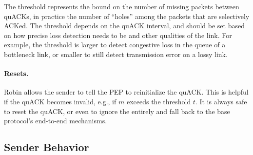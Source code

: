 The threshold represents the bound on the number of missing packets
between quACKs, in practice the number of ``holes'' among the packets that are
selectively ACKed. The threshold depends on the quACK interval, and
should be set based on how precise loss detection needs to be and
other qualities of the link.
For example, the threshold is larger to detect congestive loss in the queue of a
bottleneck link, or smaller to still detect transmission error on a lossy link.




\paragraph{Resets.}
Robin allows the sender to tell the PEP to reinitialize the quACK.
This is helpful if the quACK becomes
invalid, e.g., if $m$ exceeds the threshold $t$. It is
always safe to reset the quACK, or even to ignore the \sys entirely and
fall back to the base protocol's end-to-end mechanisms.

\subsection{Sender Behavior}

